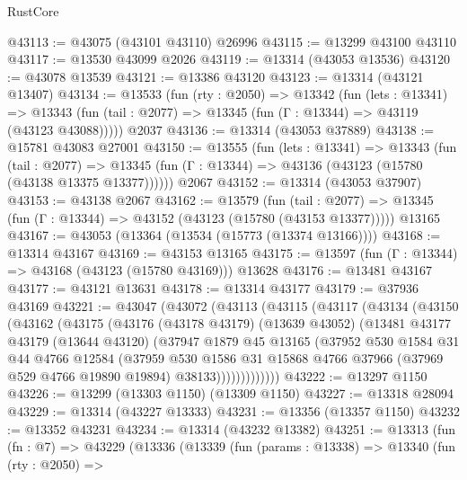 \begin{lexlean}{RustCore}
\begin{coremodule}
@43113 := @43075 (@43101 @43110) @26996
@43115 := @13299 @43100 @43110
@43117 := @13530 @43099 @2026
@43119 := @13314 (@43053 @13536)
@43120 := @43078 @13539
@43121 := @13386 @43120
@43123 := @13314 (@43121 @13407)
@43134 := @13533
    (fun (rty : @2050) =>
    @13342
      (fun (lets : @13341) =>
      @13343 (fun (tail : @2077) => @13345 (fun (Γ : @13344) => @43119 (@43123 @43088)))))
    @2037
@43136 := @13314 (@43053 @37889)
@43138 := @15781 @43083 @27001
@43150 := @13555
    (fun (lets : @13341) =>
    @13343
      (fun (tail : @2077) =>
      @13345 (fun (Γ : @13344) => @43136 (@43123 (@15780 (@43138 @13375 @13377))))))
    @2067
@43152 := @13314 (@43053 @37907)
@43153 := @43138 @2067
@43162 := @13579
    (fun (tail : @2077) => @13345 (fun (Γ : @13344) => @43152 (@43123 (@15780 (@43153 @13377)))))
    @13165
@43167 := @43053 (@13364 (@13534 (@15773 (@13374 @13166))))
@43168 := @13314 @43167
@43169 := @43153 @13165
@43175 := @13597 (fun (Γ : @13344) => @43168 (@43123 (@15780 @43169))) @13628
@43176 := @13481 @43167
@43177 := @43121 @13631
@43178 := @13314 @43177
@43179 := @37936 @43169
@43221 := @43047
    (@43072
      (@43113
        (@43115
          (@43117
            (@43134
              (@43150
                (@43162
                  (@43175
                    (@43176
                      (@43178 @43179)
                      (@13639 @43052)
                      (@13481
                        @43177
                        @43179
                        (@13644 @43120)
                        (@37947
                          @1879
                          @45
                          @13165
                          (@37952
                            @530
                            @1584
                            @31
                            @44
                            @4766
                            @12584
                            (@37959
                              @530
                              @1586
                              @31
                              @15868
                              @4766
                              @37966
                              (@37969 @529 @4766 @19890 @19894)
                              @38133)))))))))))))
@43222 := @13297 @1150
@43226 := @13299 (@13303 @1150) (@13309 @1150)
@43227 := @13318 @28094
@43229 := @13314 (@43227 @13333)
@43231 := @13356 (@13357 @1150)
@43232 := @13352 @43231
@43234 := @13314 (@43232 @13382)
@43251 := @13313
    (fun (fn : @7) =>
    @43229
      (@13336
        (@13339
          (fun (params : @13338) =>
          @13340
            (fun (rty : @2050) =>

\end{coremodule}
\end{lexlean}
